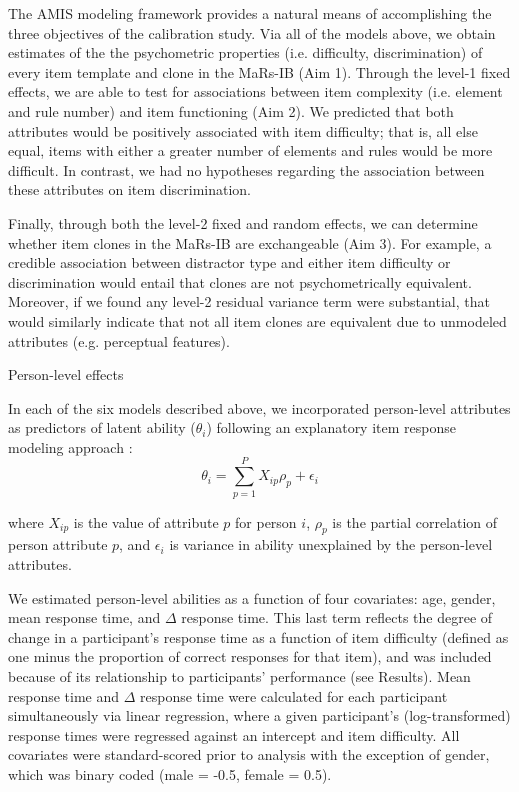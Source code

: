 \documentclass[a4paper,man,natbib,noextraspace]{apa6}
\makeatletter
\renewcommand{\subsubsection}{\@startsection{subsubsection}{3}
  {\z@}%
  {\b@level@two@skip}{\e@level@two@skip}%
  {\normalfont\normalsize\bfseries}}
\makeatother
\begin{document}
The AMIS modeling framework provides a natural means of accomplishing the three objectives of the calibration study. Via all of the models above, we obtain estimates of the the psychometric properties (i.e. difficulty, discrimination) of every item template and clone in the MaRs-IB (Aim 1). Through the level-1 fixed effects, we are able to test for associations between item complexity (i.e. element and rule number) and item functioning (Aim 2). We predicted that both attributes would be positively associated with item difficulty; that is, all else equal, items with either a greater number of elements and rules would be more difficult. In contrast, we had no hypotheses regarding the association between these attributes on item discrimination. 

Finally, through both the level-2 fixed and random effects, we can determine whether item clones in the MaRs-IB are exchangeable (Aim 3). For example, a credible association between distractor type and either item difficulty or discrimination would entail that clones are not psychometrically equivalent. Moreover, if we found any level-2 residual variance term were substantial, that would similarly indicate that not all item clones are equivalent due to unmodeled attributes (e.g. perceptual features).

\subsubsection{Person-level effects}

In each of the six models described above, we incorporated person-level attributes as predictors of latent ability ($\theta_i$) following an explanatory item response modeling approach \citep{wilson2008explanatory}: 
\begin{equation} \label{eq:4}
\theta_i = \sum_{p=1}^P X_{ip} \rho_p + \epsilon_i    
\end{equation}

\noindent where $X_{ip}$ is the value of attribute $p$ for person $i$, $\rho_p$ is the partial correlation of person attribute $p$, and $\epsilon_i$ is variance in ability unexplained by the person-level attributes. 

We estimated person-level abilities as a function of four covariates: age, gender, mean response time, and $\Delta$ response time. This last term reflects the degree of change in a participant's response time as a function of item difficulty (defined as one minus the proportion of correct responses for that item), and was included because of its relationship to participants' performance (see Results). Mean response time and $\Delta$ response time were calculated for each participant simultaneously via linear regression, where a given participant's (log-transformed) response times were regressed against an intercept and item difficulty. All covariates were standard-scored prior to analysis with the exception of gender, which was binary coded (male = -0.5, female = 0.5).
\end{document}
